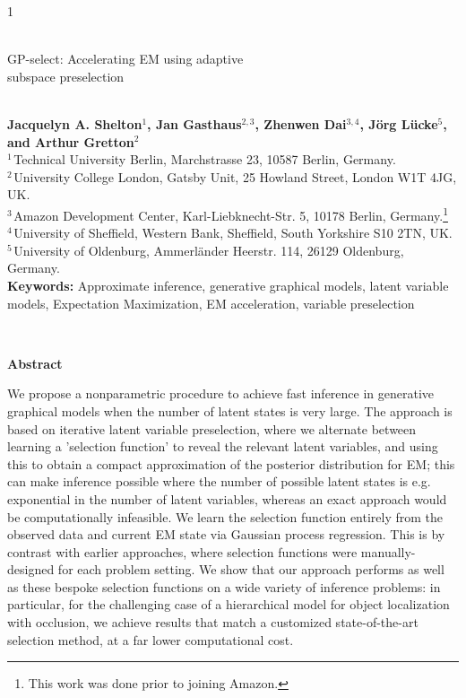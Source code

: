 \documentclass[12pt]{article}
\begin{document}
\hspace{13.9cm}1

\ \vspace{20mm}\\ 

{\LARGE GP-select: Accelerating EM using adaptive \\subspace preselection}

\ \\
{\bf \large Jacquelyn A. Shelton$^{\displaystyle 1}$, Jan Gasthaus$^{\displaystyle 2,3}$, Zhenwen Dai$^{\displaystyle 3,4}$, J\"org L\"{u}cke$^{\displaystyle 5}$, and Arthur Gretton$^{\displaystyle 2}$}\\
{$^{\displaystyle 1 \,}$Technical University Berlin, Marchstrasse 23, 10587 Berlin, Germany.}\\
{$^{\displaystyle 2 \,}$University College London, Gatsby Unit, 25 Howland Street, London W1T 4JG, UK.}\\
{$^{\displaystyle 3 \,}$Amazon Development Center, Karl-Liebknecht-Str. 5, 10178 Berlin, Germany.\footnote{This work
was done prior to joining Amazon.}}\\
{$^{\displaystyle 4 \,}$University of Sheffield, Western Bank, Sheffield, South Yorkshire S10 2TN, UK.}\\
{$^{\displaystyle 5 \,}$University of Oldenburg, Ammerl\"ander Heerstr. 114, 26129 Oldenburg, Germany.}\\
{\bf Keywords:} Approximate inference, generative graphical models, latent variable models, Expectation Maximization, EM acceleration, variable preselection

\thispagestyle{empty}
%
\ \vspace{-0mm}\\
%
\begin{center} 
{\bf Abstract} 
\end{center}
We propose a nonparametric procedure to achieve fast inference in generative graphical models when the number of latent states is very large.
 The approach is based on iterative latent variable preselection, where we alternate between learning a 'selection function' to reveal the relevant latent variables, and using this to obtain a compact approximation of the posterior distribution for EM; this can make inference possible where the number of possible latent states is e.g. exponential in the number of latent variables, whereas an exact approach would be computationally infeasible.
We learn the selection function entirely from the observed data and current EM state via Gaussian process regression. This is by contrast with earlier approaches, where selection functions were manually-designed for each problem setting.
We show that our approach performs as well as these bespoke selection functions on a wide variety of inference problems: in particular, for the challenging case of a hierarchical model for object localization with occlusion, we achieve results that match a customized state-of-the-art selection method,  at a far lower computational cost.
\end{document}
